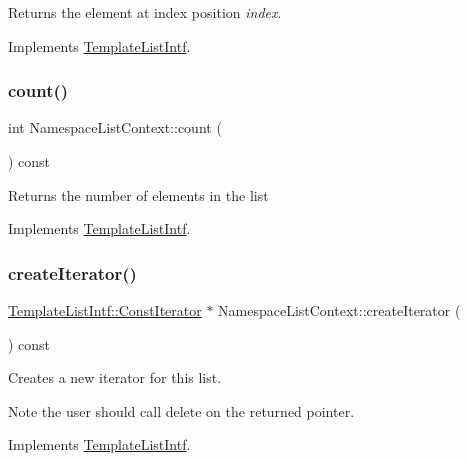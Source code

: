 Returns the element at index position {\itshape index}. 

Implements \mbox{\hyperlink{class_template_list_intf_aa51e57e72eacf4e8ce1055ee30a0f7f8}{Template\+List\+Intf}}.

\mbox{\label{class_namespace_list_context_a576ee9f319a20d0fa16fdcb3b4a3a550}} 
\subsubsection{\texorpdfstring{count()}{count()}}
{\footnotesize\ttfamily int Namespace\+List\+Context\+::count (\begin{DoxyParamCaption}{ }\end{DoxyParamCaption}) const\hspace{0.3cm}{\ttfamily [virtual]}}

Returns the number of elements in the list 

Implements \mbox{\hyperlink{class_template_list_intf_a329e49e33484c2aa5106aac1bf4e5216}{Template\+List\+Intf}}.

\mbox{\label{class_namespace_list_context_aa889694ea771d93d1094b33d46cb4208}} 
\subsubsection{\texorpdfstring{createIterator()}{createIterator()}}
{\footnotesize\ttfamily \mbox{\hyperlink{class_template_list_intf_1_1_const_iterator}{Template\+List\+Intf\+::\+Const\+Iterator}} $\ast$ Namespace\+List\+Context\+::create\+Iterator (\begin{DoxyParamCaption}{ }\end{DoxyParamCaption}) const\hspace{0.3cm}{\ttfamily [virtual]}}

Creates a new iterator for this list. \begin{DoxyNote}{Note}
the user should call delete on the returned pointer. 
\end{DoxyNote}


Implements \mbox{\hyperlink{class_template_list_intf_a56b82384db24c3e121076a1da046d378}{Template\+List\+Intf}}.

